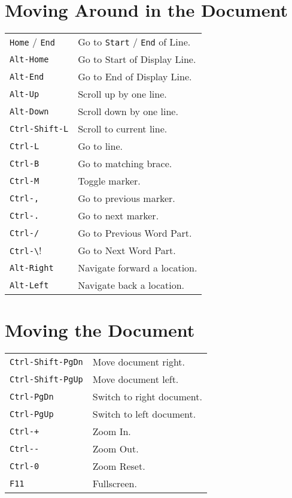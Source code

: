 \begin{multicols}{3}
	\section{Moving Around in the Document}
	\begin{tabular}{@{}ll@{}}
		\verb!Home! / \verb!End! & Go to  \verb!Start! / \verb!End! of Line. \\
		\verb!Alt-Home!          & Go to Start of Display Line.              \\
		\verb!Alt-End!           & Go to End of Display Line.                \\
		\verb!Alt-Up!            & Scroll up by one line.                    \\
		\verb!Alt-Down!          & Scroll down by one line.                  \\
		\verb!Ctrl-Shift-L!      & Scroll to current line.                   \\
		\verb!Ctrl-L!            & Go to line.                               \\
		\verb!Ctrl-B!            & Go to matching brace.                     \\
		\verb!Ctrl-M!            & Toggle marker.                            \\
		\verb!Ctrl-,!            & Go to previous marker.                    \\
		\verb!Ctrl-.!            & Go to next marker.                        \\
		\verb!Ctrl-/!            & Go to Previous Word Part.                 \\
		\verb!Ctrl-\!            & Go to Next Word Part.                     \\
		\verb!Alt-Right!         & Navigate forward a location.              \\
		\verb!Alt-Left!          & Navigate back a location.                 \\
	\end{tabular}

	\section{Moving the Document}
	\begin{tabular}{@{}ll@{}}
		\verb!Ctrl-Shift-PgDn! & Move document right.      \\
		\verb!Ctrl-Shift-PgUp! & Move document left.       \\
		\verb!Ctrl-PgDn!       & Switch to right document. \\
		\verb!Ctrl-PgUp!       & Switch to left document.  \\
		\verb!Ctrl-+!          & Zoom In.                  \\
		\verb!Ctrl--!          & Zoom Out.                 \\
		\verb!Ctrl-0!          & Zoom Reset.               \\
		\verb!F11!             & Fullscreen.               \\
	\end{tabular}


\end{multicols}
